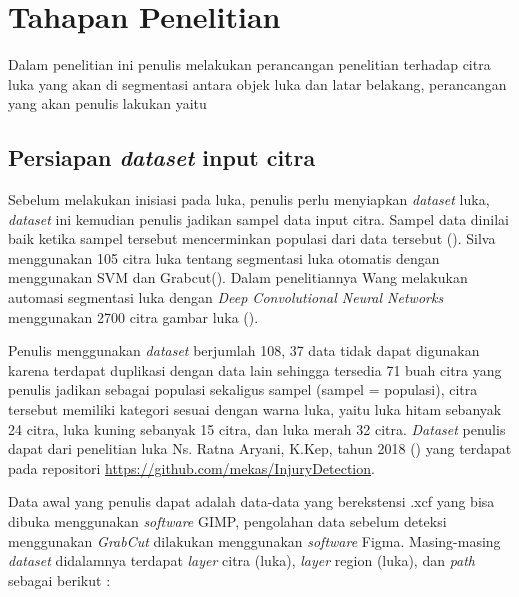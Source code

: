 \section{Tahapan Penelitian} \label{section:tahapan_penelitian}
Dalam penelitian ini penulis melakukan perancangan penelitian terhadap citra luka 
yang akan di segmentasi antara objek luka dan latar belakang, perancangan yang akan
penulis lakukan yaitu 

\subsection{Persiapan \emph{dataset} input citra}

Sebelum melakukan inisiasi pada luka, penulis perlu menyiapkan \emph{dataset} luka, \emph{dataset}
ini kemudian penulis jadikan sampel data input citra. Sampel data dinilai baik 
ketika sampel tersebut mencerminkan populasi dari data tersebut (\cite{Rizki:2022}). 
Silva menggunakan 105 citra luka tentang segmentasi luka otomatis dengan menggunakan 
SVM dan Grabcut(\cite{Silva:2015}). Dalam penelitiannya Wang melakukan automasi segmentasi luka dengan
\emph{Deep Convolutional Neural Networks} menggunakan 2700 citra gambar luka (\cite{Wang:2015}).

Penulis menggunakan \emph{dataset} berjumlah 108, 37 data tidak dapat digunakan 
karena terdapat duplikasi dengan data lain sehingga tersedia 71 buah citra 
yang penulis jadikan sebagai populasi sekaligus sampel (sampel = populasi),
citra tersebut memiliki kategori sesuai dengan warna luka, yaitu luka hitam sebanyak
24 citra, luka kuning sebanyak 15 citra, dan luka merah 32 citra. \emph{Dataset}
penulis dapat dari penelitian luka Ns. Ratna Aryani, K.Kep, tahun 2018 (\cite{Aryani:2018})
yang terdapat pada repositori \url{https://github.com/mekas/InjuryDetection}.

Data awal yang penulis dapat adalah data-data yang berekstensi .xcf yang bisa 
dibuka menggunakan \emph{software} GIMP, pengolahan data sebelum deteksi menggunakan
\emph{GrabCut} dilakukan menggunakan \emph{software} Figma. Masing-masing \emph{dataset} 
didalamnya terdapat \emph{layer} citra (luka), \emph{layer} region (luka), dan 
\emph{path} sebagai berikut :


